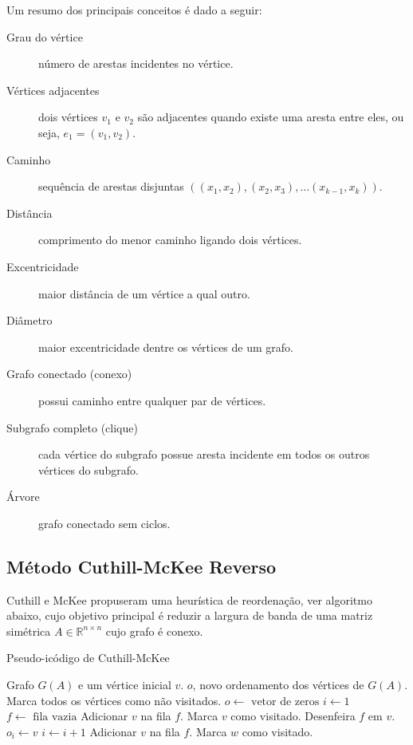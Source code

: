 Um resumo dos principais conceitos é dado a seguir:
\begin{description}
    \item[Grau do vértice] número de arestas incidentes no vértice.
    \item[Vértices adjacentes]  dois vértices $v_1$ e $v_2$ são adjacentes quando existe uma aresta entre eles, ou seja, $e_1 = (v_1, v_2)$.
    \item[Caminho] sequência de arestas disjuntas $\left( (x_1, x_2), (x_2, x_3), \ldots (x_{k - 1}, x_k) \right)$.
    \item[Distância] comprimento do menor caminho ligando dois vértices.
    \item[Excentricidade] maior distância de um vértice a qual outro.
    \item[Diâmetro] maior excentricidade dentre os vértices de um grafo.
    \item[Grafo conectado (conexo)] possui caminho entre qualquer par de vértices.
    \item[Subgrafo completo (clique)] cada vértice do subgrafo possue aresta incidente em todos os outros vértices do subgrafo.
    \item[Árvore] grafo conectado sem ciclos.
\end{description}
\subsection{Método Cuthill-McKee Reverso}
Cuthill e McKee \cite{Cuthill:1969:ReducingBandwidth} propuseram uma heurística de
reordenação, ver algoritmo abaixo, cujo objetivo principal é reduzir a largura
de banda de uma matriz simétrica $A \in \mathbb{R}^{n \times n}$ cujo grafo
é conexo.
\begin{algorithm}[H]
    \caption{Pseudo-icódigo de Cuthill-McKee}
    \label{alg:rcm}
    \begin{algorithmic}[1]
        \REQUIRE Grafo $G(A)$ e um vértice inicial $v$.
        \ENSURE $o$, novo ordenamento dos vértices de $G(A)$.
        \STATE Marca todos os vértices como não visitados.
        \STATE $o \longleftarrow \text{ vetor de zeros}$
        \STATE $i \longleftarrow 1$
        \STATE $f \longleftarrow \text{ fila vazia}$
        \STATE Adicionar $v$ na fila $f$.
        \STATE Marca $v$ como visitado.
            \STATE Desenfeira $f$ em $v$.
            \STATE $o_i \longleftarrow v$
            \STATE $i \longleftarrow i + 1$
                    \STATE Adicionar $v$ na fila $f$.
                    \STATE Marca $w$ como visitado.
                \ENDIF
            \ENDFOR
        \ENDWHILE
    \end{algorithmic}
\end{algorithm}

